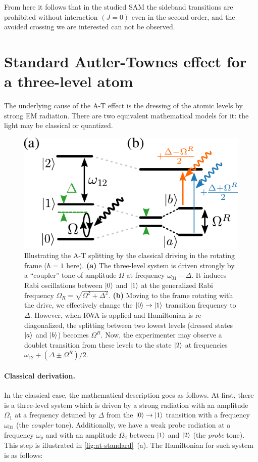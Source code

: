 \documentclass[%
 aip,
 amsmath,amssymb,
 reprint,%
]{revtex4-1}
\begin{document}
From here it follows that in the studied SAM the sideband transitions are prohibited without interaction $(J=0)$ even in the second order, and the avoided crossing we are interested can not be observed.



\appendix

\section{Standard Autler-Townes effect for a three-level atom} \label{sec:3-level-at}

The underlying cause of the A-T effect is the dressing of the atomic levels by strong EM radiation. There are two equivalent mathematical models for it: the light may be classical or quantized.

\begin{figure}
	\includegraphics[width=.9\linewidth]{intro_scheme}
	\caption{Illustrating the A-T splitting by  the classical driving in the rotating frame ($\hbar=1$ here). \textbf{(a)} The three-level system is driven strongly by a ``coupler'' tone of amplitude $\Omega$ at frequency $\omega_{01}-\Delta$. It induces Rabi oscillations between $\ket{0}$ and $\ket{1}$ at the generalized Rabi frequency $\Omega_R = \sqrt{\Omega^2 + \Delta^2}$. \textbf{(b)} Moving to the frame rotating with the drive, we effectively change the $\ket{0}\rightarrow \ket{1}$ transition frequency to $\Delta$. However, when RWA is applied and Hamiltonian is re-diagonalized, the splitting between two lowest levels (dressed states $\ket{a}$ and $\ket{b}$) becomes $\Omega^R$. Now, the experimenter may observe a doublet transition from these levels to the state $\ket{2}$ at frequencies $\omega_{12}+(\Delta \pm \Omega^R)/2$.} 
	\label{fig:at-standard}
\end{figure}

\paragraph{Classical derivation.} In the classical case, the mathematical description goes as follows. At first, there is a three-level system which is driven by a strong radiation with an amplitude $\Omega_1$ at a frequency detuned by $\Delta$ from the $\ket{0}\rightarrow \ket{1}$ transition with a frequency $\omega_{01}$ (the \textit{coupler} tone). Additionally, we have a weak probe radiation at a frequency $\omega_{p}$ and with an amplitude $\Omega_2$ between $\ket{1}$ and $\ket{2}$ (the \textit{probe} tone). This step is illustrated in \autoref{fig:at-standard}~(a). The Hamiltonian for such system is as follows:
\end{document}
